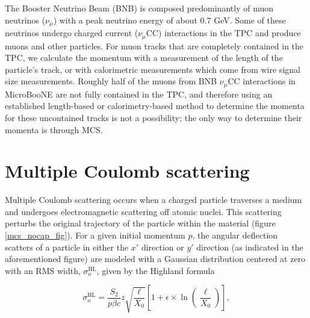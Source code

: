 \documentclass[a4paper,11pt]{article}
\begin{document}
The Booster Neutrino Beam (BNB) is composed predominantly of muon neutrinos ($\nu_\mu$) with a peak neutrino energy of about 0.7 GeV. Some of these neutrinos undergo charged current ($\nu_\mu$CC) interactions in the TPC and produce muons and other particles. For muon tracks that are completely contained in the TPC, we calculate the momentum with a measurement of the length of the particle's track, or with calorimetric measurements which come from wire signal size measurements. Roughly half of the muons from BNB $\nu_\mu$CC interactions in MicroBooNE are not fully contained in the TPC, and therefore using an established length-based or calorimetry-based method to determine the momenta for these uncontained tracks is not a possibility; the only way to determine their momenta is through MCS. \\

\section{Multiple Coulomb scattering}

Multiple Coulomb scattering occurs when a charged particle traverses a medium and undergoes electromagnetic scattering off atomic nuclei. This scattering perturbs the original trajectory of the particle within the material (figure \ref{mcs_nocap_fig}). For a given initial momentum $p$, the angular deflection scatters of a particle in either the $x'$ direction or $y'$ direction (as indicated in the aforementioned figure) are modeled with a Gaussian distribution centered at zero with an RMS width, $\sigma_o^{\text{HL}}$, given by the Highland formula \cite{highland,highland-lynch-dahl} 

\begin{equation}\label{highland_eqtn}
	\sigma_o^{\text{HL}}=\frac{S_2}{p\beta c}z\sqrt{\frac{\ell}{X_0}}\left[1+\epsilon\times\ln\left(\frac{\ell}{X_0}\right)\right],
\end{equation}
\end{document}
